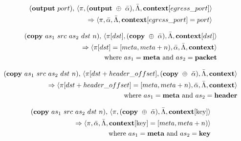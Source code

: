 \begin{equation}
\begin{split}
  (\textrm{\textbf{output}} \ port) \textrm{,} \ \langle \pi, (\textrm{\textbf{output}} \ \oplus \ \bar \alpha), \bar \Lambda,
  \textbf{\textrm{context}}[egress\_port] \rangle \\
  \Rightarrow 
  \langle \pi, \bar \alpha, \bar \Lambda,
  \textbf{\textrm{context}}[egress\_port] = port \rangle
\end{split}
\end{equation}

\begin{equation}
\begin{split}
  (\textrm{\textbf{copy}} \ as_1 \ src \ as_2 \ dst \ n)
  \textrm{,} \ \langle \pi[dst], (\textbf{\textrm{copy}} \ \oplus \ \bar \alpha), \bar \Lambda, \textrm{\textbf{context}}[dst] \rangle \\ \Rightarrow
  \langle \pi[dst] = [meta, meta + n), \bar \alpha, \bar \Lambda, \textrm{\textbf{context}} \rangle \\
    \textrm{where} \ as_1 = \textrm{\textbf{meta} and } as_2 =
    \textrm{\textbf{packet}}
\end{split}
\end{equation}

\begin{equation}
\begin{split}
  (\textrm{\textbf{copy}} \ as_1 \ src \ as_2 \ dst \ n)
  \textrm{,} \ \langle \pi[dst + header\_offset], (\textbf{\textrm{copy}} \ \oplus \ \bar \alpha), \bar \Lambda, \textrm{\textbf{context}} \rangle \\
  \Rightarrow
  \langle \pi[dst + header\_offset] = [meta, meta + n), \bar \alpha, \bar \Lambda, \textrm{\textbf{context}} \rangle \\
    \textrm{where} \ as_1 = \textrm{\textbf{meta} and } as_2 =
    \textrm{\textbf{header}}
\end{split}
\end{equation}

\begin{equation}
\begin{split}
  (\textrm{\textbf{copy}} \ as_1 \ src \ as_2 \ dst \ n)
  \textrm{,} \ \langle \pi, (\textrm{\textbf{copy}} \ \oplus \ \bar \alpha), \bar \Lambda, \textrm{\textbf{context}[key]} \rangle \\
  \Rightarrow
  \langle \pi, \bar \alpha, \bar \Lambda, \textrm{\textbf{context}[key]} = [meta, meta + n) \rangle \\
    \textrm{where} \ as_1 = \textrm{\textbf{meta} and } as_2 =
    \textrm{\textbf{key}}
\end{split}
\end{equation}

